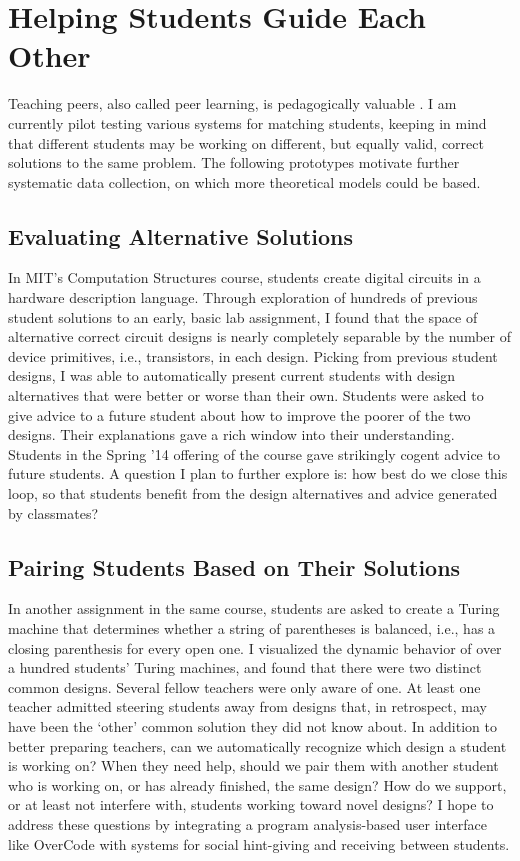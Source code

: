 \documentclass{sigchi}
\begin{document}
\section{Helping Students Guide Each Other}
Teaching peers, also called peer learning, is pedagogically valuable \cite{boud2014peer}. I am currently pilot testing various systems for matching students, keeping in mind that different students may be working on different, but equally valid, correct solutions to the same problem. The following prototypes motivate further systematic data collection, on which more theoretical models could be based.

\break

\subsection{Evaluating Alternative Solutions} In MIT's Computation Structures course, students create digital circuits in a hardware description language. Through exploration of hundreds of previous student solutions to an early, basic lab assignment, I found that the space of alternative correct circuit designs is nearly completely separable by the number of device primitives, i.e., transistors, in each design. Picking from previous student designs, I was able to automatically present current students with design alternatives that were better or worse than their own. Students were asked to give advice to a future student about how to improve the poorer of the two designs. Their explanations gave a rich window into their understanding. Students in the Spring '14 offering of the course gave strikingly cogent advice to future students. A question I plan to further explore is: how best do we close this loop, so that students benefit from the design alternatives and advice generated by classmates?

\subsection{Pairing Students Based on Their Solutions} In another assignment in the same course, students are asked to create a Turing machine that determines whether a string of parentheses is balanced, i.e., has a closing parenthesis for every open one. I visualized the dynamic behavior of over a hundred students' Turing machines, and found that there were two distinct common designs. Several fellow teachers were only aware of one. At least one teacher admitted steering students away from designs that, in retrospect, may have been the `other' common solution they did not know about. In addition to better preparing teachers, can we automatically recognize which design a student is working on? When they need help, should we pair them with another student who is working on, or has already finished, the same design? How do we support, or at least not interfere with, students working toward novel designs? I hope to address these questions by integrating a program analysis-based user interface like OverCode with systems for social hint-giving and receiving between students.
\end{document}
